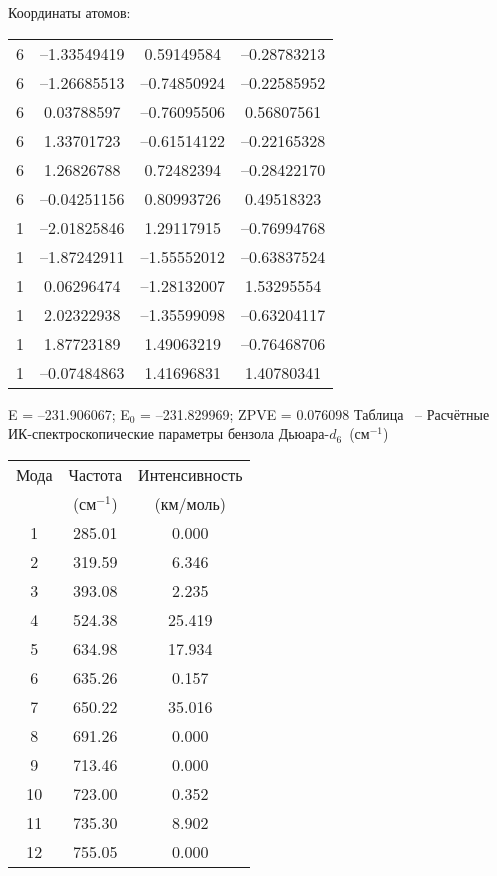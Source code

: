 {Координаты атомов:
\begin{center}
\begin{tabular}{cccc}
 6  &  --1.33549419 &  0.59149584 & --0.28783213\\
   6 &   --1.26685513 & --0.74850924 & --0.22585952\\
   6 &    0.03788597 & --0.76095506 &  0.56807561\\
   6 &    1.33701723 & --0.61514122 & --0.22165328\\
   6 &    1.26826788 &  0.72482394 & --0.28422170\\
   6 &   --0.04251156 &  0.80993726 &  0.49518323\\
   1 &   --2.01825846 &  1.29117915 & --0.76994768\\
   1 &   --1.87242911 & --1.55552012 & --0.63837524\\
   1 &    0.06296474 & --1.28132007 &  1.53295554\\
   1 &    2.02322938 & --1.35599098 & --0.63204117\\
   1 &    1.87723189 &  1.49063219 & --0.76468706\\
   1 &   --0.07484863 &  1.41696831 &  1.40780341\\
 \end{tabular}
\end{center}
E =  --231.906067;    E$_0$ =  --231.829969; ZPVE = 0.076098
\newpage {}
Таблица \thet\, -- Расчётные ИК-спектроскопические параметры бензола Дьюара-$d_6$~(см$^{-1}$)
\begin{center}
\begin{tabular}{ccc}
Мода & Частота   & Интенсивность \\
&(см$^{-1}$)&(км/моль)\\
\hline
     1 &  285.01 &     0.000 \\
    2 &  319.59 &    6.346 \\
     3 &  393.08 &    2.235 \\
     4 &  524.38 &  25.419 \\
     5 &  634.98 &  17.934 \\
     6 &  635.26 &   0.157 \\
     7 &  650.22 &   35.016 \\
     8 &  691.26 &    0.000 \\
     9 &  713.46 &    0.000 \\
    10 &  723.00 &    0.352 \\
    11 &  735.30 & 8.902 \\
    12 &  755.05 &    0.000 \\

\end{tabular}
\end{center}}
